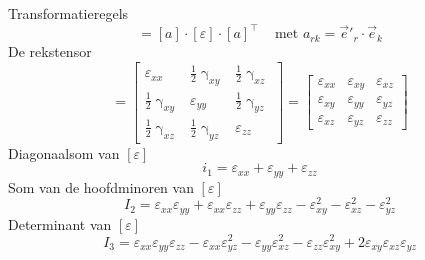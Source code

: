             Transformatieregels
            \begin{equation}
                [\varepsilon'] = [a]\cdot[\varepsilon]\cdot[a]^{\top} \;\;\; \text{ met } a_{rk} = \vec{e}'_r\cdot\vec{e}_k
                \label{rektransformatie}
            \end{equation}
            De rekstensor
            \begin{equation}
                [\varepsilon] = \left[\begin{matrix}
                    \varepsilon_{xx} & \frac{1}{2}\upgamma_{xy} & \frac{1}{2}\upgamma_{xz} \\
                    \frac{1}{2}\upgamma_{xy} & \varepsilon_{yy} & \frac{1}{2}\upgamma_{yz} \\
                    \frac{1}{2}\upgamma_{xz} & \frac{1}{2}\upgamma_{yz} & \varepsilon_{zz}
                \end{matrix}\right] = \left[\begin{matrix}
                    \varepsilon_{xx} & \varepsilon_{xy} & \varepsilon_{xz} \\
                    \varepsilon_{xy} & \varepsilon_{yy} & \varepsilon_{yz} \\
                    \varepsilon_{xz} & \varepsilon_{yz} & \varepsilon_{zz}
                \end{matrix}\right]
                \label{rektensor}
            \end{equation}
            Diagonaalsom van $[\varepsilon]$
            \begin{equation}
                i_1 = \varepsilon_{xx} + \varepsilon_{yy} + \varepsilon_{zz}
                \label{Diagonaalsom_epsilon}
            \end{equation}
            Som van de hoofdminoren van $[\varepsilon]$
            \begin{equation}
                I_2 = \varepsilon_{xx}\varepsilon_{yy} + \varepsilon_{xx}\varepsilon_{zz} + \varepsilon_{yy}\varepsilon_{zz} - \varepsilon_{xy}^2 - \varepsilon_{xz}^2 - \varepsilon_{yz}^2
                \label{Hoofdminoren_epsilon}
            \end{equation}
            Determinant van $[\varepsilon]$
            \begin{equation}
                I_3 = \varepsilon_{xx}\varepsilon_{yy}\varepsilon_{zz} - \varepsilon_{xx}\varepsilon_{yz}^2-\varepsilon_{yy}\varepsilon_{xz}^2-\varepsilon_{zz}\varepsilon_{xy}^2+2\varepsilon_{xy}\varepsilon_{xz}\varepsilon_{yz}
                \label{Determinant_epsilon}
            \end{equation}
                
